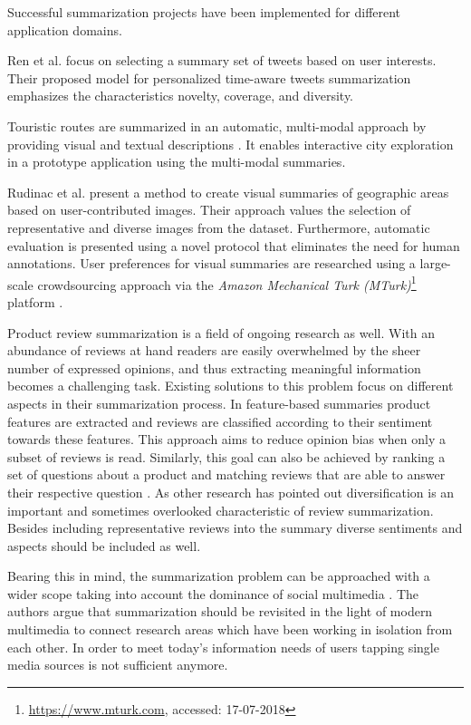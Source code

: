 Successful summarization projects have been implemented for different application domains.

Ren et al. \cite{Ren2013} focus on selecting a summary set of tweets based on user interests.
Their proposed model for personalized time-aware tweets summarization emphasizes the characteristics novelty, coverage, and diversity.

Touristic routes are summarized in an automatic, multi-modal approach by providing visual and textual descriptions \cite{VanDenBerg}.
It enables interactive city exploration in a prototype application using the multi-modal summaries.

Rudinac et al. \cite{Rudinac2013a} present a method to create visual summaries of geographic areas based on user-contributed images.
Their approach values the selection of representative and diverse images from the dataset.
Furthermore, automatic evaluation is presented using a novel protocol that eliminates the need for human annotations.
User preferences for visual summaries are researched using a large-scale crowdsourcing approach via the \textit{Amazon Mechanical Turk (MTurk)}\footnote{\url{https://www.mturk.com}, accessed: 17-07-2018} platform  \cite{Rudinac2013}.

Product review summarization is a field of ongoing research as well.
With an abundance of reviews at hand readers are easily overwhelmed by the sheer number of expressed opinions, and thus extracting meaningful information becomes a challenging task.
Existing solutions to this problem focus on different aspects in their summarization process.
In feature-based summaries \cite{Hu2004} product features are extracted and reviews are classified according to their sentiment towards these features.
This approach aims to reduce opinion bias when only a subset of reviews is read.
Similarly, this goal can also be achieved by ranking a set of questions about a product and matching reviews that are able to answer their respective question \cite{Liu2017}.
As other research has pointed out \cite{Liu2017, Al-Dhelaan2017} diversification is an important and sometimes overlooked characteristic of review summarization.
Besides including representative reviews into the summary diverse sentiments and aspects should be included as well.

Bearing this in mind, the summarization problem can be approached with a wider scope taking into account the dominance of social multimedia \cite{B2018a}.
The authors argue that summarization should be revisited in the light of modern multimedia to connect research areas which have been working in isolation from each other.
In order to meet today's information needs of users tapping single media sources is not sufficient anymore.